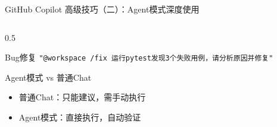 \documentclass[aspectratio=169,11pt]{beamer}
\begin{document}
\begin{frame}[fragile]{GitHub Copilot 高级技巧（二）：Agent模式深度使用}
\begin{columns}
\begin{column}{0.5\textwidth}
            \begin{block}{Bug修复}
                \scriptsize
                \texttt{"@workspace /fix 运行pytest发现3个失败用例，请分析原因并修复"}
            \end{block}
            
            \vspace{0.2cm}
            \begin{alertblock}{Agent模式 vs 普通Chat}
                \small
                \begin{itemize}
                    \item 普通Chat：只能建议，需手动执行
                    \item Agent模式：直接执行，自动验证
                \end{itemize}
            \end{alertblock}
        \end{column}
    \end{columns}
\end{frame}
\end{document}
